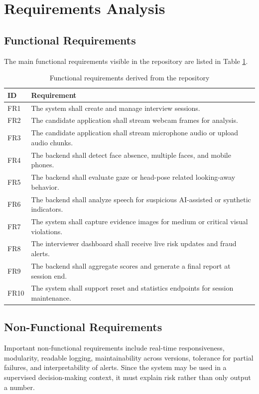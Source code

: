 \documentclass[12pt,a4paper]{extreport}
\begin{document}
\section{Requirements Analysis}
\subsection{Functional Requirements}
The main functional requirements visible in the repository are listed in Table \ref{tab:functional_requirements}.

\begin{table}[H]
\centering
\caption{Functional requirements derived from the repository}
\label{tab:functional_requirements}
\begin{tabularx}{\textwidth}{p{1.1cm}X}
\toprule
\textbf{ID} & \textbf{Requirement}\\
\midrule
FR1 & The system shall create and manage interview sessions.\\
FR2 & The candidate application shall stream webcam frames for analysis.\\
FR3 & The candidate application shall stream microphone audio or upload audio chunks.\\
FR4 & The backend shall detect face absence, multiple faces, and mobile phones.\\
FR5 & The backend shall evaluate gaze or head-pose related looking-away behavior.\\
FR6 & The backend shall analyze speech for suspicious AI-assisted or synthetic indicators.\\
FR7 & The system shall capture evidence images for medium or critical visual violations.\\
FR8 & The interviewer dashboard shall receive live risk updates and fraud alerts.\\
FR9 & The backend shall aggregate scores and generate a final report at session end.\\
FR10 & The system shall support reset and statistics endpoints for session maintenance.\\
\bottomrule
\end{tabularx}
\end{table}

\subsection{Non-Functional Requirements}
Important non-functional requirements include real-time responsiveness, modularity, readable logging, maintainability across versions, tolerance for partial failures, and interpretability of alerts. Since the system may be used in a supervised decision-making context, it must explain risk rather than only output a number.
\end{document}
